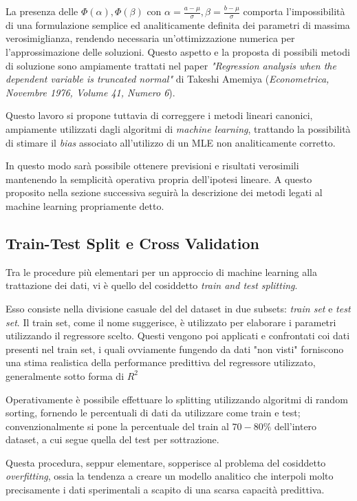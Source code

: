 \documentclass[a4paper]{report}
\begin{document}
La presenza delle $\Phi(\alpha),\Phi(\beta)$ con $\alpha=\frac{a-\mu}{\sigma}, \beta=\frac{b-\mu} {\sigma}$ comporta l'impossibilità di una formulazione semplice ed analiticamente definita dei parametri di massima verosimiglianza, rendendo necessaria un'ottimizzazione numerica per l'approssimazione delle soluzioni.
Questo aspetto e la proposta di possibili metodi di soluzione sono ampiamente trattati nel paper \textit{"Regression analysis when the dependent variable is truncated normal"} di Takeshi Amemiya (\textit{Econometrica, Novembre 1976, Volume 41, Numero 6}).

Questo lavoro si propone tuttavia di correggere i metodi lineari canonici, ampiamente utilizzati dagli algoritmi di \textit{machine learning}, trattando la possibilità di stimare il \textit{bias} associato all'utilizzo di un MLE non analiticamente corretto. 

In questo modo sarà possibile ottenere previsioni e risultati verosimili mantenendo la semplicità operativa propria dell'ipotesi lineare.
A questo proposito nella sezione successiva seguirà la descrizione dei metodi legati al machine learning propriamente detto.

\subsection{Train-Test Split e Cross Validation}
Tra le procedure più elementari per un approccio di machine learning alla trattazione dei dati, vi è quello del cosiddetto \textit{train and test splitting}.

Esso consiste nella divisione casuale del del dataset in due subsets: \textit{train set} e \textit{test set}.
Il train set, come il nome suggerisce, è utilizzato per elaborare i parametri utilizzando il regressore scelto.
Questi vengono poi applicati e confrontati coi dati presenti nel train set, i quali ovviamente fungendo da dati "non visti" forniscono una stima realistica della performance predittiva del regressore utilizzato, generalmente sotto forma di $R^2$

Operativamente è possibile effettuare lo splitting utilizzando algoritmi di random sorting, fornendo le percentuali di dati da utilizzare come train e test; convenzionalmente si pone la percentuale del train al $70-80\%$ dell'intero dataset, a cui segue quella del test per sottrazione.

Questa procedura, seppur elementare, sopperisce al problema del cosiddetto \textit{overfitting}, ossia la tendenza a creare un modello analitico che interpoli molto precisamente i dati sperimentali a scapito di una scarsa capacità predittiva.
\end{document}
